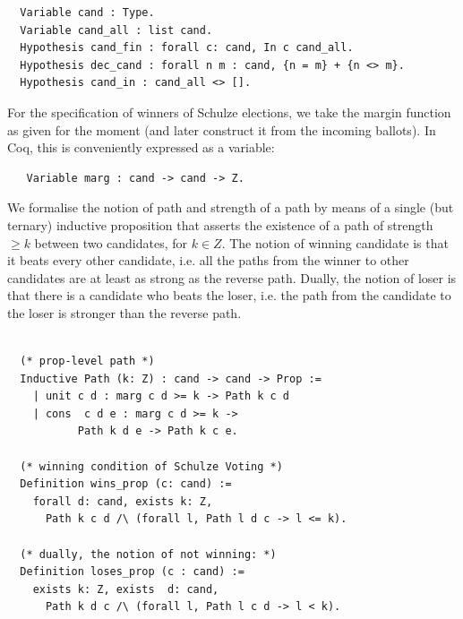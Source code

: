 \begin{verbatim}
  Variable cand : Type.
  Variable cand_all : list cand.
  Hypothesis cand_fin : forall c: cand, In c cand_all.
  Hypothesis dec_cand : forall n m : cand, {n = m} + {n <> m}.
  Hypothesis cand_in : cand_all <> [].
\end{verbatim}

\noindent
For the specification of winners of Schulze elections, we take the
margin function as given for the moment (and later construct it from
the incoming ballots). In Coq, this is conveniently expressed as a
variable:

\begin{verbatim}
   Variable marg : cand -> cand -> Z.   
\end{verbatim}


\noindent
We formalise the notion of path and strength of a path by means of a
single (but ternary) inductive proposition that asserts the
existence of a path of strength $\geq k$ between two candidates, for
$k \in Z$. The notion of winning candidate is that it beats every other candidate, i.e.  all the paths from 
the winner to other candidates are at least as strong as the reverse path. Dually, the notion of loser
 is that there is a candidate who beats the loser, i.e. the path from the candidate to the loser is 
 stronger than the reverse path. 

\begin{verbatim}

  (* prop-level path *)
  Inductive Path (k: Z) : cand -> cand -> Prop :=
    | unit c d : marg c d >= k -> Path k c d
    | cons  c d e : marg c d >= k -> 
           Path k d e -> Path k c e.
    
  (* winning condition of Schulze Voting *)
  Definition wins_prop (c: cand) := 
    forall d: cand, exists k: Z,
      Path k c d /\ (forall l, Path l d c -> l <= k).

  (* dually, the notion of not winning: *)
  Definition loses_prop (c : cand) := 
    exists k: Z, exists  d: cand,
      Path k d c /\ (forall l, Path l c d -> l < k).

\end{verbatim}

